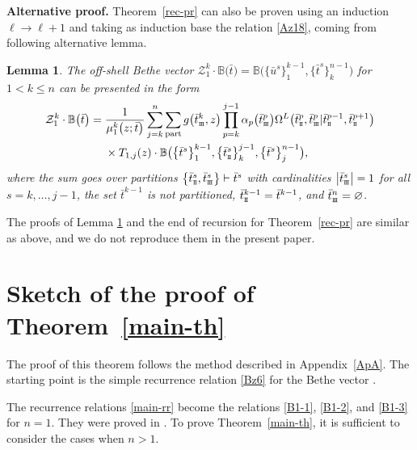 \documentclass[10pt,a4paper]{amsart}
\newcommand{\st}{\scriptscriptstyle \rm I\hspace{-1pt}I}
\newcommand{\sth}{\scriptscriptstyle \rm I\hspace{-1pt}I\hspace{-1pt}I}
\newcommand{\bu}{\bar u}
\newcommand{\bt}{{\bar t}}
\newcommand{\bw}{\bar w}
\newtheorem{lem}[thm]{Lemma}
\theoremstyle{definition}
\def\BB{{\mathbb{B}}}
\def\r#1{\eqref{#1}}
\def\Z{\mathcal{Z}}
\def\Oml{\Omega^L}
\begin{document}
{\bf Alternative proof.}
Theorem~\ref{rec-pr} can also be proven using an induction $\ell\to \ell+1$ and
taking as induction base the relation \eqref{Az18}, coming from following alternative lemma.
\begin{lem}\label{r-pr}
The off-shell Bethe vector $\Z_{1}^{k}\cdot \BB\bigl(\bt\bigr)=\BB\bigl(\bigl\{\bu^s\bigr\}_1^{k-1},\bigl\{\bt^{s}\bigr\}_k^{n-1}\bigr)$ for $1<k\leq n$
can be presented in the form
\begin{align}
\Z_{1}^{k}\cdot \BB\bigl(\bt\bigr)={}&
\frac1{\mu_1^k\bigl(z;\bt\bigr)}
\sum_{j=k}^n \sum_{\rm part} g\bigl(\bt^{k}_{\sth},z\bigr)
\prod_{p=k}^{j-1}\alpha_p\bigl(\bt^p_{\sth}\bigr)
\Oml\bigl(\bt^p_{\st},\bt^p_{\sth}|\bt^{p-1}_{\st},\bt^{p+1}_{\st}\bigr)\nonumber\\
&\times T_{1,j}(z)\cdot\BB\bigl(\bigl\{\bt^s\bigr\}_1^{k-1},\bigl\{\bt^s_{\st}\bigr\}_{k}^{j-1},
\bigl\{\bt^s\bigr\}_j^{n-1}\bigr),\label{Az18}
\end{align}
where the sum goes over partitions $ \bigl\{\bt^s_{\st},\bt^s_{\sth}\bigr\}\vdash\bt^s$
with cardinalities $\big|\bt^s_{\sth}\big|=1$ for all $s=k,\dots,j-1$, the set $\bt^{k-1}$ is not partitioned, $\bt^{k-1}_{\st}=\bt^{k-1}$, and $\bt^{n}_{\sth} = \varnothing$.
\end{lem}
The proofs of Lemma \ref{r-pr} and the end of recursion for Theorem~\ref{rec-pr} are similar as above, and we do not reproduce them in the present paper.

\section[Sketch of the proof of Theorem 4.1]{Sketch of the proof of Theorem~\ref{main-th}}\label{ApB}

The proof of this theorem follows the method
described in Appendix~\ref{ApA}. The starting point is the simple
recurrence relation \r{Bz6} for the Bethe vector \smash{$\BB\bigl(\bigl\{\bw^s\bigr\}_0^{n-1}\bigr)$}.

The recurrence relations \r{main-rr} become the relations \r{B1-1}, \r{B1-2}, and
\r{B1-3} for $n=1$. They were proved in \cite{LPRS19}. To prove Theorem~\ref{main-th}, it is sufficient to consider the cases when $n>1$.
\end{document}
